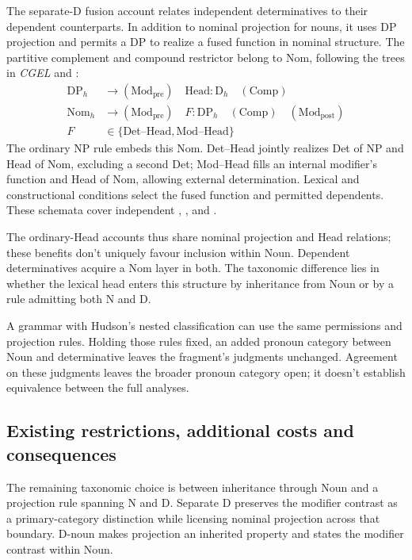 \documentclass[12pt]{article}
\begin{document}
The separate-D fusion account relates independent determinatives to their dependent counterparts. In addition to nominal projection for nouns, it uses DP projection and permits a DP to realize a fused function in nominal structure. The partitive complement and compound restrictor belong to Nom, following the trees in \textit{CGEL} and \textcite[582]{Payne2007}:
\[
\begin{aligned}
\mathrm{DP}_{h} &\to (\mathrm{Mod}_{\mathrm{pre}})\quad \mathrm{Head}:\mathrm{D}_{h}\quad (\mathrm{Comp}) \\
\mathrm{Nom}_{h} &\to (\mathrm{Mod}_{\mathrm{pre}})\quad F:\mathrm{DP}_{h}\quad (\mathrm{Comp})\quad (\mathrm{Mod}_{\mathrm{post}}) \\
F&\in\{\mathrm{Det\text{--}Head},\mathrm{Mod\text{--}Head}\}
\end{aligned}
\]
The ordinary NP rule embeds this Nom. Det--Head jointly realizes Det of NP and Head of Nom, excluding a second Det; Mod--Head fills an internal modifier's function and Head of Nom, allowing external determination. Lexical and constructional conditions select the fused function and permitted dependents. These schemata cover independent , ,  and .

The ordinary-Head accounts thus share nominal projection and Head relations; these benefits don't uniquely favour inclusion within Noun. Dependent determinatives acquire a Nom layer in both. The taxonomic difference lies in whether the lexical head enters this structure by inheritance from Noun or by a rule admitting both N and D.

A grammar with Hudson's nested classification can use the same permissions and projection rules. Holding those rules fixed, an added pronoun category between Noun and determinative leaves the fragment's judgments unchanged. Agreement on these judgments leaves the broader pronoun category open; it doesn't establish equivalence between the full analyses.

\subsection{Existing restrictions, additional costs and consequences}\label{sec:costs}

The remaining taxonomic choice is between inheritance through Noun and a projection rule spanning N and D. Separate D preserves the modifier contrast as a primary-category distinction while licensing nominal projection across that boundary. D-noun makes projection an inherited property and states the modifier contrast within Noun.
\end{document}
